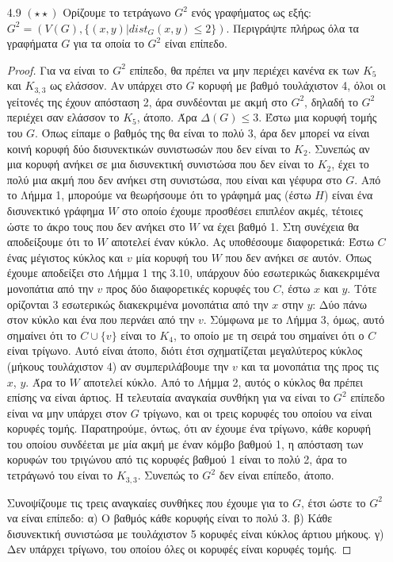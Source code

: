 \documentclass[a4paper, oneside, 11pt]{article}
\theoremstyle{definition}
\begin{document}
\begin{enumerate}
\item[4.9 $(\star\star)$]
	Ορίζουμε το τετράγωνο $G^2$ ενός γραφήματος ως εξής: $G^2 = (V(G), \{(x,y) | dist_G (x,y) \leq 2\})$. Περιγράψτε πλήρως όλα τα γραφήματα $G$ για τα οποία το $G^2$ είναι επίπεδο.
	\begin{proof}
Για να είναι το $G^2$ επίπεδο, θα πρέπει να μην περιέχει κανένα εκ των $K_5$ και $K_{3,3}$ ως ελάσσον. Αν υπάρχει στο $G$ κορυφή με βαθμό τουλάχιστον 4, όλοι οι γείτονές της έχουν απόσταση 2, άρα συνδέονται
με ακμή στο $G^2$, δηλαδή το $G^2$ περιέχει σαν ελάσσον το $K_5$, άτοπο. Άρα $\Delta (G)\leq 3$. Έστω μια κορυφή τομής του $G$. Όπως είπαμε ο βαθμός της θα είναι το πολύ 3, άρα δεν μπορεί να είναι κοινή
κορυφή δύο δισυνεκτικών συνιστωσών που δεν είναι το $K_2$.
 Συνεπώς αν μια κορυφή ανήκει σε μια δισυνεκτική συνιστώσα που δεν είναι το $K_2$, έχει το πολύ μια ακμή που δεν ανήκει στη συνιστώσα, που είναι και γέφυρα στο $G$. Από το Λήμμα 1,
μπορούμε να θεωρήσουμε ότι το γράφημά μας (έστω $H$) είναι ένα δισυνεκτικό γράφημα $W$ στο οποίο έχουμε προσθέσει επιπλέον ακμές, τέτοιες ώστε το άκρο τους που δεν ανήκει στο $W$ να έχει βαθμό 1.
Στη συνέχεια θα αποδείξουμε ότι το $W$ αποτελεί έναν κύκλο. Ας υποθέσουμε διαφορετικά: Έστω $C$ ένας μέγιστος κύκλος και $v$ μία κορυφή του $W$ που δεν ανήκει σε αυτόν. Όπως έχουμε αποδείξει στο Λήμμα 1
της 3.10, υπάρχουν δύο εσωτερικώς διακεκριμένα μονοπάτια από την $v$ προς δύο διαφορετικές κορυφές του $C$, έστω $x$ και $y$. Τότε ορίζονται 3 εσωτερικώς διακεκριμένα μονοπάτια από την $x$ στην $y$: Δύο
πάνω στον κύκλο και ένα που περνάει από την $v$. Σύμφωνα με το Λήμμα 3, όμως, αυτό σημαίνει ότι το $C\cup \{v\}$ είναι το $K_4$, το οποίο με τη σειρά του σημαίνει ότι ο $C$ είναι τρίγωνο. Αυτό είναι άτοπο,
διότι έτσι σχηματίζεται μεγαλύτερος κύκλος (μήκους τουλάχιστον 4) αν συμπεριλάβουμε την $v$ και τα μονοπάτια της προς τις $x$, $y$. Άρα το $W$ αποτελεί κύκλο. Από το Λήμμα 2, αυτός ο κύκλος θα πρέπει επίσης
να είναι άρτιος. Η τελευταία αναγκαία συνθήκη για να είναι το $G^2$ επίπεδο είναι να μην υπάρχει στον $G$ τρίγωνο, και οι τρεις κορυφές του οποίου να είναι κορυφές τομής. Παρατηρούμε, όντως, ότι αν έχουμε
ένα τρίγωνο, κάθε κορυφή του οποίου συνδέεται με μία ακμή με έναν κόμβο βαθμού 1, η απόσταση των κορυφών του τριγώνου από τις κορυφές βαθμού 1 είναι το πολύ 2, άρα το τετράγωνό του είναι το $K_{3,3}$.
Συνεπώς το $G^2$ δεν είναι επίπεδο, άτοπο.
\newline

Συνοψίζουμε τις τρεις αναγκαίες συνθήκες που έχουμε για το $G$, έτσι ώστε το $G^2$ να είναι επίπεδο:
α) Ο βαθμός κάθε κορυφής είναι το πολύ 3.
β) Κάθε δισυνεκτική συνιστώσα με τουλάχιστον 5 κορυφές είναι κύκλος άρτιου μήκους.
γ) Δεν υπάρχει τρίγωνο, του οποίου όλες οι κορυφές είναι κορυφές τομής.
\newline


\end{proof}
\end{enumerate}
\end{document}
